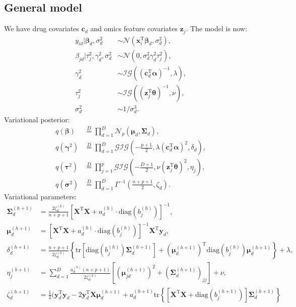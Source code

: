 \documentclass[a4paper,hidelinks]{article}\usepackage[]{graphicx}\usepackage[]{color}
\newcommand{\bSigma}{\bm{\Sigma}}
\newcommand{\bmu}{\bm{\mu}}
\newcommand{\y}{\mathbf{y}}
\newcommand{\X}{\mathbf{X}}
\newcommand{\x}{\mathbf{x}}
\newcommand{\0}{\bm{0}}
\newcommand{\tr}{^{\text{T}}}
\newcommand{\diag}{\text{diag}}
\newcommand{\trace}{\text{tr}}
\renewcommand{\(}{\left(}
\renewcommand{\)}{\right)}
\renewcommand{\[}{\left[}
\renewcommand{\]}{\right]}
\begin{document}
\begin{appendix}
		\section{General model}
		We have drug covariates $\mathbf{c}_d$ and omics feature covariates $\mathbf{z}_j$. The model is now:
		\begin{align*}
		y_{id} | \bm{\beta}_d, \sigma_d^2 & \sim \mathcal{N} (\x_i \tr \bm{\beta}_d, \sigma_d^2), \\
		\beta_{jd} | \tau_j^2, \gamma_d^2, \sigma_d^2 & \sim \mathcal{N} (0, \sigma_d^2 \gamma_d^2 \tau_j^2), \\
		\gamma_d^2 & \sim \mathcal{IG}\((\mathbf{c}_d \tr \bm{\alpha})^{-1}, \lambda\), \\
		\tau_j^2 & \sim \mathcal{IG}\((\mathbf{z}_j \tr \bm{\theta})^{-1}, \nu\), \\
		\sigma_d^2 & \sim 1/\sigma_d^3.
		\end{align*}
		Variational posterior:
		\begin{align*}
		q(\bm{\beta}) & \overset{D}{=} \prod_{d=1}^D \mathcal{N}_p (\bm{\mu}_d, \bm{\Sigma}_d), \\
		q(\bm{\gamma}^2) & \overset{D}{=} \prod_{d=1}^D \mathcal{GIG}\(-\frac{p+1}{2}, \lambda (\mathbf{c}_d \tr \bm{\alpha})^2, \delta_d\), \\
		q(\bm{\tau}^2) & \overset{D}{=} \prod_{j=1}^p \mathcal{GIG}\(-\frac{D+1}{2}, \nu (\mathbf{z}_j \tr \bm{\theta})^2, \eta_j\), \\
		q(\bm{\sigma}^2) & \overset{D}{=} \prod_{d=1}^D \Gamma^{-1} \(\frac{n + p + 1}{2}, \zeta_d\).
		\end{align*}
		Variational parameters:
		\begin{align*}
		\bm{\Sigma}_d^{(h+1)} & = \frac{2 \zeta_d^{(h)}}{n+p+1} \[\X \tr \X + a_d^{(h)} \cdot \diag(b_j^{(h)})\]^{-1}, \\
		\bm{\mu}_d^{(h+1)} & = \[\X \tr \X + a_d^{(h)} \cdot \diag(b_j^{(h)})\]^{-1} \X \tr \y_d, \\
		\delta_d^{(h+1)} & = \frac{n+p+1}{2 \zeta_d^{(h)}} \left\{\trace \[\diag(b_j^{(h)}) \bm{\Sigma}_d^{(h+1)} \] + (\bm{\mu}_d^{(h+1)}) \tr \diag(b_j^{(h)}) \bm{\mu}_d^{(h+1)}\right\} + \lambda, \\ 
		\eta_j^{(h+1)} & = \sum_{d=1}^D \frac{a_d^{(h)}(n+p+1)}{2 \zeta_d^{(h)}} \[ (\bmu_{jd}^{(h + 1)})^2 + (\bSigma_d^{(h + 1)})_{jj} \] + \nu, \\ 
		\zeta_d^{(h+1)} & = \frac{1}{2} \Big( \mathbf{y}_d \tr \mathbf{y}_d -2 \mathbf{y}_d \tr \X \bm{\mu}_d^{(h+1)} + a_d^{(h+1)} \trace \left\{ \[\X \tr \X + \diag(b_j^{(h + 1)})\] \bm{\Sigma}_d^{(h+1)}\right\} \\

\end{align*}
\end{appendix}
\end{document}
